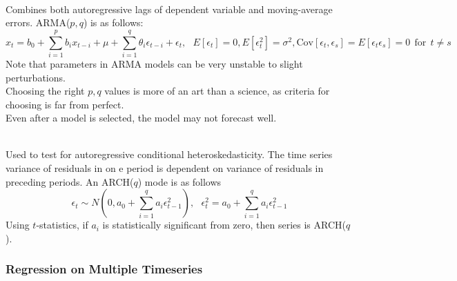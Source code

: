 \begin{definition} \\
Combines both autoregressive lags of dependent variable and moving-average errors. ARMA($p,q$) is as follows:
\begin{equation}
x_t = b_0 + \sum\limits_{i=1}^p b_i x_{t-i} + \mu + \sum\limits_{i=1}^q \theta_i \epsilon_{t-i} + \epsilon_t, \ \ \ E[\epsilon_t] = 0, E[\epsilon_t^2] = \sigma^2, \text{Cov}[\epsilon_t, \epsilon_s] = E[\epsilon_t \epsilon_s] = 0 \ \ \text{for} \ \ t \neq s \nonumber
\end{equation}
Note that parameters in ARMA models can be very unstable to slight perturbations.\\
Choosing the right $p,q$ values is more of an art than a science, as criteria for choosing is far from perfect.\\
Even after a model is selected, the model may not forecast well.
\end{definition}

\begin{definition} \\
Used to test for autoregressive conditional heteroskedasticity. The time series variance of residuals in on e period is dependent on variance of residuals in preceding periods. An ARCH($q$) mode is as follows
\begin{equation}
\epsilon_t \sim N \left( 0, a_0 + \sum\limits_{i=1}^q a_i \epsilon_{t-1}^2 \right), \ \ \ \epsilon_t^2 = a_0 + \sum\limits_{i=1}^q a_i \epsilon_{t-1}^2 \nonumber
\end{equation}
Using $t$-statistics, if $a_i$ is statistically significant from zero, then series is ARCH($q$).
\end{definition}

\subsubsection{Regression on Multiple Timeseries}

